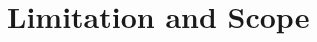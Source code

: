 \documentclass[12pt,oneside]{book}
\begin{document}





\clearpage

\section{Limitation and Scope}
\end{document}
